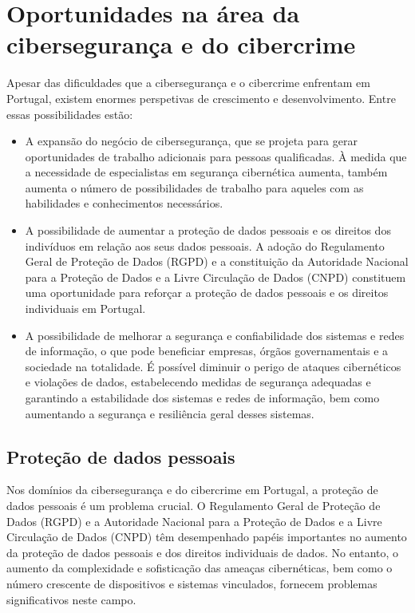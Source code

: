 \section{Oportunidades na área da cibersegurança e do cibercrime}

Apesar das dificuldades que a cibersegurança e o cibercrime enfrentam em Portugal, existem enormes perspetivas de crescimento e desenvolvimento. Entre essas possibilidades estão:

\begin{itemize}
  - \itemA criação e aplicação de novas tecnologias e estratégias para identificar e investigar crimes cibernéticos e proteger contra ameaças cibernéticas. Isso envolve o uso de inteligência artificial e aprendizado de máquina para aumentar a precisão e a eficiência dos sistemas de segurança, além de criar técnicas para detetar e responder a ameaças cibernéticas.
  \item A expansão do negócio de cibersegurança, que se projeta para gerar oportunidades de trabalho adicionais para pessoas qualificadas. À medida que a necessidade de especialistas em segurança cibernética aumenta, também aumenta o número de possibilidades de trabalho para aqueles com as habilidades e conhecimentos necessários.
  \item A possibilidade de aumentar a proteção de dados pessoais e os direitos dos indivíduos em relação aos seus dados pessoais. A adoção do Regulamento Geral de Proteção de Dados (RGPD) e a constituição da Autoridade Nacional para a Proteção de Dados e a Livre Circulação de Dados (CNPD) constituem uma oportunidade para reforçar a proteção de dados pessoais e os direitos individuais em Portugal.
  \item A possibilidade de melhorar a segurança e confiabilidade dos sistemas e redes de informação, o que pode beneficiar empresas, órgãos governamentais e a sociedade na totalidade. É possível diminuir o perigo de ataques cibernéticos e violações de dados, estabelecendo medidas de segurança adequadas e garantindo a estabilidade dos sistemas e redes de informação, bem como aumentando a segurança e resiliência geral desses sistemas.
\end{itemize}

\subsection{Proteção de dados pessoais}

Nos domínios da cibersegurança e do cibercrime em Portugal, a proteção de dados pessoais é um problema crucial. O Regulamento Geral de Proteção de Dados (RGPD) e a Autoridade Nacional para a Proteção de Dados e a Livre Circulação de Dados (CNPD) têm desempenhado papéis importantes no aumento da proteção de dados pessoais e dos direitos individuais de dados. No entanto, o aumento da complexidade e sofisticação das ameaças cibernéticas, bem como o número crescente de dispositivos e sistemas vinculados, fornecem problemas significativos neste campo.

